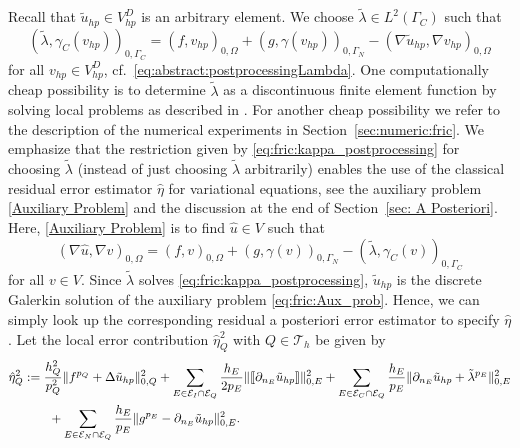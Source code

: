 \documentclass[12pt,twoside,reqno]{amsart}
\theoremstyle{definition}
\numberwithin{equation}{section}
\newcommand  {\T}   {\mathscr T}
\newcommand{\norm}[1]    {\Vert #1 \Vert}
\begin{document}
            Recall that $\tilde{u}_{hp}\in V_{hp}^D$ is an arbitrary element.
            We choose $\tilde{\lambda} \in L^2(\Gamma_C)$ such that 
            \begin{equation} \label{eq:fric:kappa_postprocessing}
                (\tilde{\lambda},\gamma_C(v_{hp}))_{0,\Gamma_C} = (f,v_{hp})_{0,\Omega}+(g,\gamma(v_{hp}))_{0,\Gamma_N}-(\nabla \tilde{u}_{hp}, \nabla v_{hp})_{0,\Omega}
            \end{equation}
            for all $v_{hp}\in V_{hp}^D$, cf.~\eqref{eq:abstract:postprocessingLambda}. One computationally cheap possibility is to determine $\tilde{\lambda}$ as a discontinuous finite element function by solving local problems as described in \cite[Sec.~5]{Burg2015}. For another cheap possibility we refer to the description of the numerical experiments in Section~\ref{sec:numeric:fric}.
%
        We emphasize that  the restriction given by \eqref{eq:fric:kappa_postprocessing} for choosing $\tilde{\lambda}$ (instead of just choosing $\tilde{\lambda}$ arbitrarily) enables the use of the classical residual error estimator $\hat{\eta}$ for variational equations,  see the auxiliary problem \eqref{Auxiliary Problem} and the discussion at the end of Section~\ref{sec: A Posteriori}.
        Here, \eqref{Auxiliary Problem} is to find $\hat{u}\in V$ such that
            \begin{equation} \label{eq:fric:Aux_prob}
                (\nabla \hat{u},\nabla v)_{0,\Omega} = (f,v)_{0,\Omega}+(g,\gamma(v))_{0,\Gamma_N}-(\tilde{\lambda},\gamma_C(v))_{0,\Gamma_C}
            \end{equation}
           for all $v\in V$. Since $\tilde{\lambda}$ solves \eqref{eq:fric:kappa_postprocessing}, $\tilde{u}_{hp}$ is the discrete Galerkin solution of the auxiliary problem \eqref{eq:fric:Aux_prob}.  Hence, we can simply look up the corresponding residual a posteriori error estimator  to specify $\hat{\eta}$.
            Let the local error contribution $\hat\eta_Q^2$ with $Q\in \T_h$ be given by
            \begin{equation*}%
            \aligned
                \hat\eta_Q^2&:= \frac{h_Q^2}{p_Q^2}\norm{f^{p_Q}+\Delta \tilde{u}_{hp}}_{0,Q}^2 + \sum\limits_{E\in \mathcal{E}_I\cap\mathcal{E}_Q}\frac{h_E}{2p_E}\norm{\llbracket \partial_{n_E}\tilde{u}_{hp}\rrbracket}_{0,E}^2 +  \sum\limits_{E\in \mathcal{E}_C\cap\mathcal{E}_Q} \frac{h_E}{p_E}\norm{\partial_{n_E}\tilde{u}_{hp}+\tilde{\lambda}^{p_E}}_{0,E}^2 \\
                &\qquad + \sum\limits_{E\in\mathcal{E}_N\cap\mathcal{E}_Q}\frac{h_E}{p_E}\norm{g^{p_E}-\partial_{n_E}\tilde{u}_{hp}}_{0,E}^2.
              \endaligned  
            \end{equation*}
\end{document}
